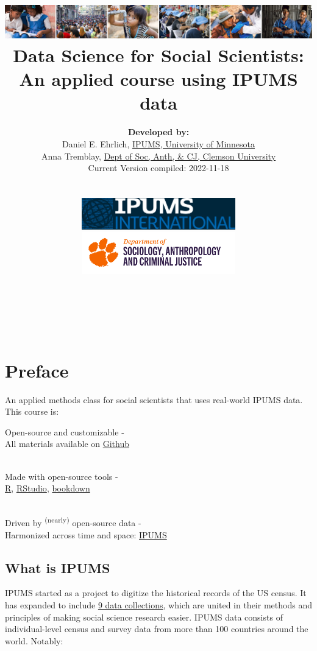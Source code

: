 \documentclass[
]{book}
\title{\includegraphics{ipums_banner.png}\\
Data Science for Social Scientists:\\
An applied course using IPUMS data }
\author{\textbf{Developed by:}\\
\hspace*{0.333em}\hspace*{0.333em}Daniel E. Ehrlich, \href{https://international.ipums.org/international/}{IPUMS, University of Minnesota}\\
\hspace*{0.333em}\hspace*{0.333em}Anna Tremblay, \href{https://www.clemson.edu/cbshs/departments/sacj/degrees/anthropology.html}{Dept of Soc, Anth, \& CJ, Clemson University}\\
\hspace*{0.333em}\hspace*{0.333em}Current Version compiled: 2022-11-18\\
\strut \\
\includegraphics[width=0.5\textwidth,height=\textheight]{ipums_i_logo.jpg}\\
\includegraphics[width=0.5\textwidth,height=\textheight]{clemson_logo.png}\\
\strut \\
\strut \\}
\date{}
\begin{document}
\maketitle

{
\setcounter{tocdepth}{1}
\tableofcontents
}
\hypertarget{preface}{%
\chapter*{Preface}\label{preface}}

An applied methods class for social scientists that uses real-world IPUMS data. This course is:

Open-source and customizable -\\
\hspace*{0.333em}\hspace*{0.333em}\hspace*{0.333em}All materials available on \href{https://github.com/ehrlichd/stats_book}{Github}\\
\strut \\
Made with open-source tools -\\
\hspace*{0.333em}\hspace*{0.333em}\href{https://cran.r-project.org/}{R}, \href{https://www.rstudio.com/products/rstudio/}{RStudio}, \href{https://bookdown.org/}{bookdown}\\
\strut \\
Driven by \textsuperscript{(nearly)} open-source data -\\
\hspace*{0.333em}\hspace*{0.333em}Harmonized across time and space: \href{https://ipums.org}{IPUMS}\\

\hypertarget{what-is-ipums}{%
\section*{What is IPUMS}\label{what-is-ipums}}

IPUMS started as a project to digitize the historical records of the US census.
It has expanded to include \href{https://www.ipums.org/}{9 data collections},
which are united in their methods and principles of making social science
research easier. IPUMS data consists of individual-level census and survey data
from more than 100 countries around the world. Notably:
\end{document}
